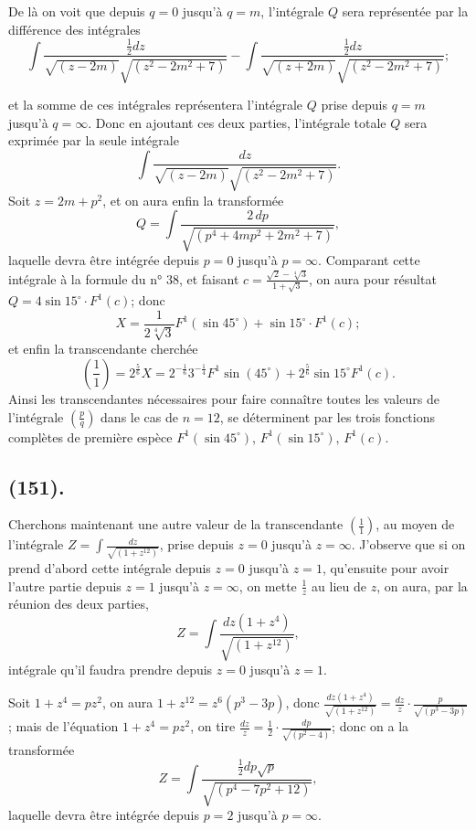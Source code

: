 \documentclass{article}
\begin{document}
De là on voit que depuis $q=0$ jusqu'à $q=m$, l'intégrale $Q$ sera représentée par la différence des intégrales
\[ \int\frac{\tfrac{1}{2}dz}{\sqrt{(z-2m)}\sqrt{(z^{2}-2m^{2}+7)}}-\int\frac{\tfrac{1}{2}dz}{\sqrt{(z+2m)}\sqrt{(z^{2}-2m^{2}+7)}}; \]

et la somme de ces intégrales représentera l'intégrale $Q$ prise depuis $q=m$ jusqu'à $q=\infty$. Donc en ajoutant ces deux parties, l'intégrale totale $Q$ sera exprimée par la seule intégrale
\[ \int\frac{dz}{\sqrt{(z-2m)}\sqrt{(z^{2}-2m^{2}+7)}}. \]
Soit $z=2m+p^{2}$, et on aura enfin la transformée
\[ Q=\int\frac{2\,dp}{\sqrt{(p^{4}+4mp^{2}+2m^{2}+7)}}, \]
laquelle devra être intégrée depuis $p=0$ jusqu'à $p=\infty$. Comparant cette intégrale à la formule du n° 38, et faisant $c=\frac{\sqrt{2}-\sqrt[4]{3}}{1+\sqrt{3}}$, on aura pour résultat $Q=4\sin 15^{\circ}\cdot F^{1}(c)$; donc
\[ X=\frac{1}{2\sqrt[4]{3}}F^{1}(\sin 45^{\circ})+\sin 15^{\circ}\cdot F^{1}(c); \]
et enfin la transcendante cherchée
\[ \left(\frac{1}{1}\right)=2^{\frac{5}{6}}X=2^{-\frac{1}{6}}3^{-\frac{1}{4}}F^{1}\sin(45^{\circ})+2^{\frac{5}{6}}\sin 15^{\circ}F^{1}(c). \]
Ainsi les transcendantes nécessaires pour faire connaître toutes les valeurs de l'intégrale $\left(\frac{p}{q}\right)$ dans le cas de $n=12$, se déterminent par les trois fonctions complètes de première espèce $F^{1}(\sin 45^{\circ})$, $F^{1}(\sin 15^{\circ})$, $F^{1}(c)$.

\subsection*{(151).}

Cherchons maintenant une autre valeur de la transcendante $\left(\frac{1}{1}\right)$, au moyen de l'intégrale $Z=\displaystyle\int\frac{dz}{\sqrt{(1+z^{12})}}$, prise depuis $z=0$ jusqu'à $z=\infty$. J'observe que si on prend d'abord cette intégrale depuis $z=0$ jusqu'à $z=1$, qu'ensuite pour avoir l'autre partie depuis $z=1$ jusqu'à $z=\infty$, on mette $\frac{1}{z}$ au lieu de $z$, on aura, par la réunion des deux parties,
\[ Z=\int\frac{dz(1+z^{4})}{\sqrt{(1+z^{12})}}, \]
intégrale qu'il faudra prendre depuis $z=0$ jusqu'à $z=1$.


Soit $1+z^{4}=pz^{2}$, on aura $1+z^{12}=z^{6}(p^{3}-3p)$, donc $\frac{dz(1+z^{4})}{\sqrt{(1+z^{12})}}=\frac{dz}{z}\cdot\frac{p}{\sqrt{(p^{3}-3p)}}$; mais de l'équation $1+z^{4}=pz^{2}$, on tire $\frac{dz}{z}=\frac{1}{2}\cdot\frac{dp}{\sqrt{(p^{2}-4)}}$; donc on a la transformée
\[ Z=\int\frac{\tfrac{1}{2}dp\sqrt{p}}{\sqrt{(p^{4}-7p^{2}+12)}}, \]
laquelle devra être intégrée depuis $p=2$ jusqu'à $p=\infty$.
\end{document}
